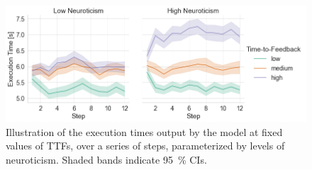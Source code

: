 \begin{figure}[tb]
    \centering
    \includegraphics[width=\textwidth]{Figs/2023EdgeDroid2/model_exectime_over_steps}
    \caption{
        Illustration of the execution times output by the model at fixed values of \glspl{TTF}, over a series of steps, parameterized by levels of neuroticism.
        Shaded bands indicate \SI{95}{\percent} \glspl{CI}.
    }\label{fig:model:exectimesoversteps}
\end{figure}

